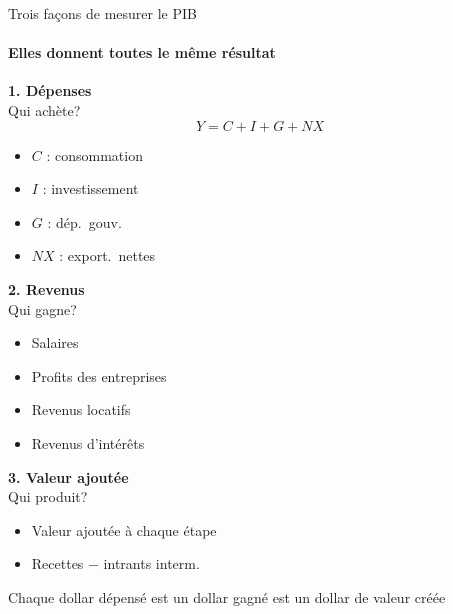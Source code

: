 \documentclass[aspectratio=169]{beamer}
\begin{document}
\begin{frame}[t]{Trois fa\c{c}ons de mesurer le PIB}
   \framesubtitle{Elles donnent toutes le m\^eme r\'esultat}

   \small
   \noindent%
   \begin{minipage}[t]{0.33\textwidth}
      \textbf{\textcolor{HECnavy}{1. D\'epenses}}\\[4pt]
      Qui ach\`ete?
      \vspace{-0.2cm}
      \begin{equation*}
         Y = C + I + G + NX
      \end{equation*}
      \vspace{-0.8cm}
      \begin{itemize}
         \footnotesize
         \item $C$ : consommation
         \item $I$ : investissement
         \item $G$ : d\'ep.\ gouv.
         \item $NX$ : export.\ nettes
      \end{itemize}
   \end{minipage}%
   \begin{minipage}[t]{0.33\textwidth}
      \textbf{\textcolor{HECnavy}{2. Revenus}}\\[4pt]
      Qui gagne?
      \vspace{0.1cm}
      \begin{itemize}
         \footnotesize
         \item Salaires
         \item Profits des entreprises
         \item Revenus locatifs
         \item Revenus d'int\'er\^ets
      \end{itemize}
   \end{minipage}%
   \hspace{-0.5cm}
   \begin{minipage}[t]{0.33\textwidth}
      \textbf{\textcolor{HECnavy}{3. Valeur ajout\'ee}}\\[4pt]
      Qui produit?
      \vspace{0.1cm}
      \begin{itemize}
         \footnotesize
         \item Valeur ajout\'ee \`a chaque \'etape
         \item Recettes $-$ intrants interm.
      \end{itemize}
   \end{minipage}
   \vspace{0.1cm}
   \begin{keyinsight}
      Chaque dollar d\'epens\'e est un dollar gagn\'e est un dollar de valeur cr\'e\'ee
   \end{keyinsight}
\end{frame}
\end{document}
